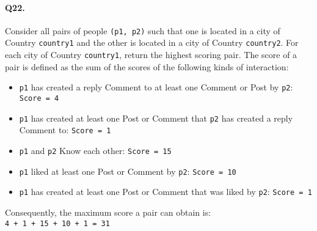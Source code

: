 \paragraph{Q22.}
Consider all pairs of people \texttt{(p1,\ p2)} such that one is located
in a city of Country \texttt{country1} and the other is located in a
city of Country \texttt{country2}.
For each city of Country \texttt{country1}, return the highest scoring
pair.
The score of a pair is defined as the sum of the scores of the following
kinds of interaction:
\begin{itemize}
\tightlist
\item
  \texttt{p1} has created a reply Comment to at least one Comment or
  Post by \texttt{p2}: \texttt{Score\ =\ 4}
\item
  \texttt{p1} has created at least one Post or Comment that \texttt{p2}
  has created a reply Comment to: \texttt{Score\ =\ 1}
\item
  \texttt{p1} and \texttt{p2} Know each other: \texttt{Score\ =\ 15}
\item
  \texttt{p1} liked at least one Post or Comment by \texttt{p2}:
  \texttt{Score\ =\ 10}
\item
  \texttt{p1} has created at least one Post or Comment that was liked by
  \texttt{p2}: \texttt{Score\ =\ 1}
\end{itemize}
Consequently, the maximum score a pair can obtain is:
\texttt{4\ +\ 1\ +\ 15\ +\ 10\ +\ 1\ =\ 31}
